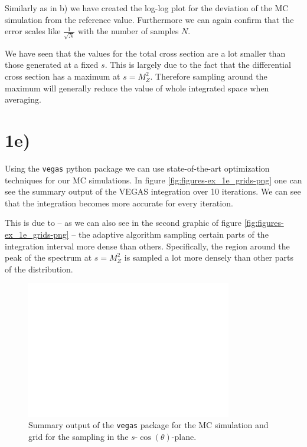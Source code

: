 \documentclass[12pt,a4paper]{scrartcl}
\begin{document}
Similarly as in b) we have created the log-log plot for the deviation of the MC simulation from the reference value.
Furthermore we can again confirm that the error scales like $\frac{1}{\sqrt{N} }$ with the number of samples $N$.

We have seen that the values for the total cross section are a lot smaller than those generated at a fixed $s$.
This is largely due to the fact that the differential cross section has a maximum at $s = M_Z^2$.
Therefore sampling around the maximum will generally reduce the value of whole integrated space when averaging.


\section*{1e)}

Using the \lstinline{vegas} python package we can use state-of-the-art optimization techniques for our MC simulations.
In figure \eqref{fig:figures-ex_1e_grids-png} one can see the summary output of the VEGAS integration over 10 iterations.
We can see that the integration becomes more accurate for every iteration.

This is due to -- as we can also see in the second graphic of figure \eqref{fig:figures-ex_1e_grids-png} -- the adaptive algorithm sampling certain parts of the integration interval more dense than others.
Specifically, the region around the peak of the spectrum at $s = M_Z^2$ is sampled a lot more densely than other parts of the distribution.

\begin{figure}[htpb]
    \centering
    \includegraphics[width=0.8\textwidth]{figures/ex_1e_grids.png}
    \caption{Summary output of the \lstinline{vegas} package for the MC simulation and grid for the sampling in the $s$-$\cos( \theta  ) $-plane.}
    \label{fig:figures-ex_1e_grids-png}
\end{figure}
\end{document}

